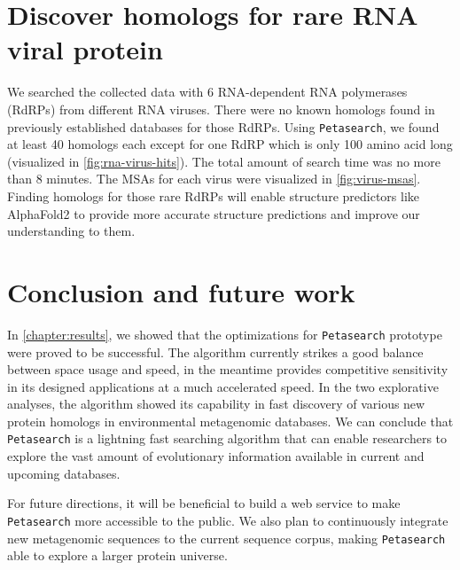 \section{Discover homologs for rare RNA viral protein} \label{section:discover-homologs-for-rare-rna-virus-protein}

We searched the collected data with 6 RNA-dependent RNA polymerases (RdRPs) from different RNA viruses. There were no known homologs found in previously established databases for those RdRPs. Using \texttt{Petasearch}, we found at least 40 homologs each except for one RdRP which is only 100 amino acid long (visualized in \autoref{fig:rna-virus-hits}). The total amount of search time was no more than 8 minutes. The MSAs for each virus were visualized in \autoref{fig:virus-msas}. Finding homologs for those rare RdRPs will enable structure predictors like AlphaFold2 to provide more accurate structure predictions and improve our understanding to them.

\pagebreak
\begin{figpage}
  \begin{figure}
    \centering

  \end{figure}
\end{figpage}
\pagebreak

\section{Conclusion and future work} \label{section:conclusion-and-future-work}

In \cref{chapter:results}, we showed that the optimizations for \texttt{Petasearch} prototype were proved to be successful. The algorithm currently strikes a good balance between space usage and speed, in the meantime provides competitive sensitivity in its designed applications at a much accelerated speed. In the two explorative analyses, the algorithm showed its capability in fast discovery of various new protein homologs in environmental metagenomic databases. We can conclude that \texttt{Petasearch} is a lightning fast searching algorithm that can enable researchers to explore the vast amount of evolutionary information available in current and upcoming databases.

For future directions, it will be beneficial to build a web service to make \texttt{Petasearch} more accessible to the public. We also plan to continuously integrate new metagenomic sequences to the current sequence corpus, making \texttt{Petasearch} able to explore a larger protein universe.
